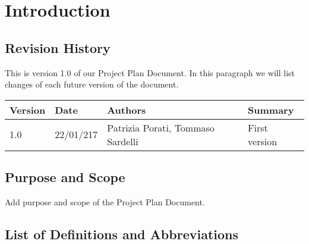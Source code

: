 \section{Introduction}

\subsection{Revision History}

	This is version 1.0 of our Project Plan Document.
	In this paragraph we will list changes of each future version of the document.
	
	\begin{tabular}{|l|l|l|l|}
		\hline
		\textbf{Version}	& \textbf{Date}	& \textbf{Authors}	& \textbf{Summary}\\
		\hline
		1.0					& 22/01/217		& Patrizia Porati, Tommaso Sardelli	& First version\\
		\hline
	\end{tabular}

\subsection{Purpose and Scope}

	Add purpose and scope of the Project Plan Document.
	
\subsection{List of Definitions and Abbreviations}

